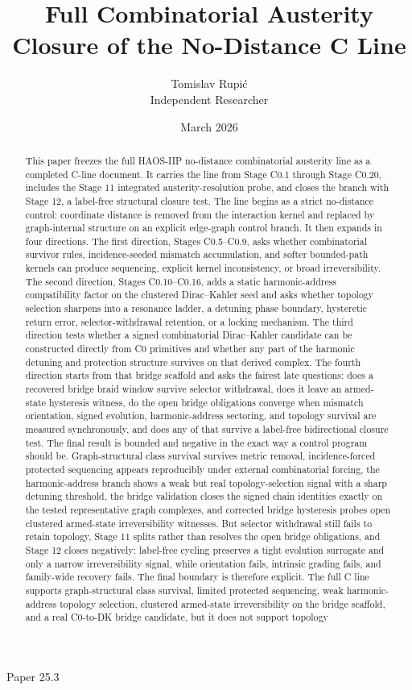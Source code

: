 \documentclass[11pt]{article}
\title{Full Combinatorial Austerity Closure of the No-Distance C Line}
\author{Tomislav Rupi\'c \\ Independent Researcher}
\date{March 2026}
\begin{document}
\maketitle
\begin{center}
\large Paper 25.3
\end{center}

\begin{abstract}
This paper freezes the full HAOS-IIP no-distance combinatorial austerity line as a completed C-line document. It carries the line from Stage C0.1 through Stage C0.20, includes the Stage 11 integrated austerity-resolution probe, and closes the branch with Stage 12, a label-free structural closure test. The line begins as a strict no-distance control: coordinate distance is removed from the interaction kernel and replaced by graph-internal structure on an explicit edge-graph control branch. It then expands in four directions. The first direction, Stages C0.5--C0.9, asks whether combinatorial survivor rules, incidence-seeded mismatch accumulation, and softer bounded-path kernels can produce sequencing, explicit kernel inconsistency, or broad irreversibility. The second direction, Stages C0.10--C0.16, adds a static harmonic-address compatibility factor on the clustered Dirac--Kahler seed and asks whether topology selection sharpens into a resonance ladder, a detuning phase boundary, hysteretic return error, selector-withdrawal retention, or a locking mechanism. The third direction tests whether a signed combinatorial Dirac--Kahler candidate can be constructed directly from C0 primitives and whether any part of the harmonic detuning and protection structure survives on that derived complex. The fourth direction starts from that bridge scaffold and asks the fairest late questions: does a recovered bridge braid window survive selector withdrawal, does it leave an armed-state hysteresis witness, do the open bridge obligations converge when mismatch orientation, signed evolution, harmonic-address sectoring, and topology survival are measured synchronously, and does any of that survive a label-free bidirectional closure test. The final result is bounded and negative in the exact way a control program should be. Graph-structural class survival survives metric removal, incidence-forced protected sequencing appears reproducibly under external combinatorial forcing, the harmonic-address branch shows a weak but real topology-selection signal with a sharp detuning threshold, the bridge validation closes the signed chain identities exactly on the tested representative graph complexes, and corrected bridge hysteresis probes open clustered armed-state irreversibility witnesses. But selector withdrawal still fails to retain topology, Stage 11 splits rather than resolves the open bridge obligations, and Stage 12 closes negatively: label-free cycling preserves a tight evolution surrogate and only a narrow irreversibility signal, while orientation fails, intrinsic grading fails, and family-wide recovery fails. The final boundary is therefore explicit. The full C line supports graph-structural class survival, limited protected sequencing, weak harmonic-address topology selection, clustered armed-state irreversibility on the bridge scaffold, and a real C0-to-DK bridge candidate, but it does not support topology 
\end{abstract}
\end{document}
